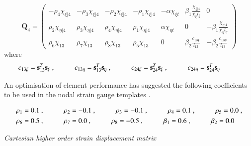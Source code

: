 \begin{equation} 
\mathbf{Q}_4 =
\begin{pmatrix}
-\rho_4 \chi_{\xi | 4} & -\rho_3 \chi_{\xi | 4} & -\rho_2 \chi_{\xi | 4} & -\rho_1 \chi_{\xi | 4} & -\alpha \chi_{\xi t} & \beta_1 \frac{\chi_{\xi | 4}}{\bar{\chi_\xi} l_\xi} & 0  \\	
\rho_2 \chi_{\eta | 4} & \rho_3 \chi_{\eta | 4} & \rho_4 \chi_{\eta | 4} & \rho_1 \chi_{\eta | 4} & \alpha \chi_{\eta t} & 0 & -\beta_1 \frac{\chi_{\eta | 4}}{\bar{\chi_\eta} l_\eta} \\
\rho_6 \chi_{13} & \rho_7 \chi_{13} & \rho_8 \chi_{13} & \rho_5 \chi_{13} & 0 & \beta_2 \frac{c_{13 \xi}}{l_{13}} & -\beta_2 \frac{c_{13 \eta}}{l_{13}}
\end{pmatrix}		
\label{equation15}
\end{equation}
where
\begin{align*} 
	c_{13 \xi} = \mathbf{s}_{13}^T \mathbf{s_\xi}\ ,
	\hspace{10mm}
	c_{13 \eta} = \mathbf{s}_{13}^T \mathbf{s_\eta}\ ,
	\hspace{10mm}
	c_{24 \xi} = \mathbf{s}_{24}^T \mathbf{s_\xi}\ ,
	\hspace{10mm}
	c_{24 \eta} = \mathbf{s}_{24}^T \mathbf{s_\eta}
	\hspace{10mm}
\end{align*}

An optimisation of element performance has suggested the following coefficients to be used in the nodal strain gauge templates \cite{Hau94}. 

\begin{gather} 
	\begin{aligned}
		&\rho_1 = 0.1\ ,
		\hspace{10mm}
		\rho_2 = -0.1\ ,
		\hspace{10mm}
		\rho_3 = -0.1\ ,
		\hspace{10mm}
		\rho_4 = 0.1\ ,
		\hspace{10mm}
		\rho_5 = 0.0\ , \\
		&\rho_6 = 0.5\ ,
		\hspace{10mm}
		\rho_7 = 0.0\ ,
		\hspace{10mm}
		\rho_8 = -0.5\ ,
		\hspace{10mm}
		\beta_1 = 0.6\ ,
		\hspace{10mm}
		\beta_2 = 0.0
		\label{equation16}
	\end{aligned}
\end{gather}

\textit{Cartesian higher order strain displacement matrix}


